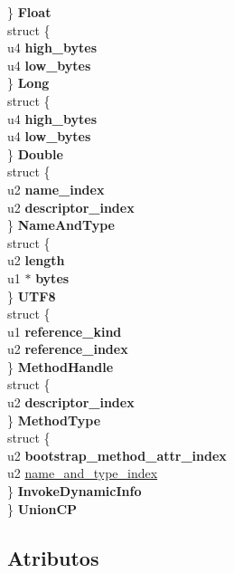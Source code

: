 \begin{DoxyCompactItemize}
\begin{tabbing}
\>\} {\bfseries Float}\\
\>struct \{\\
\>\>u4 {\bfseries high\_bytes}\\
\>\>u4 {\bfseries low\_bytes}\\
\>\} {\bfseries Long}\\
\>struct \{\\
\>\>u4 {\bfseries high\_bytes}\\
\>\>u4 {\bfseries low\_bytes}\\
\>\} {\bfseries Double}\\
\>struct \{\\
\>\>u2 {\bfseries name\_index}\\
\>\>u2 {\bfseries descriptor\_index}\\
\>\} {\bfseries NameAndType}\\
\>struct \{\\
\>\>u2 {\bfseries length}\\
\>\>u1 $\ast$ {\bfseries bytes}\\
\>\} {\bfseries UTF8}\\
\>struct \{\\
\>\>u1 {\bfseries reference\_kind}\\
\>\>u2 {\bfseries reference\_index}\\
\>\} {\bfseries MethodHandle}\\
\>struct \{\\
\>\>u2 {\bfseries descriptor\_index}\\
\>\} {\bfseries MethodType}\\
\>struct \{\\
\>\>u2 {\bfseries bootstrap\_method\_attr\_index}\\
\>\>u2 \hyperlink{structcp__info_a1b947f3ff3eee58acf5500debf45848c}{name\_and\_type\_index}\\
\>\} {\bfseries InvokeDynamicInfo}\\
\} {\bfseries UnionCP}\\

\end{tabbing}\end{DoxyCompactItemize}


\subsection{Atributos}
\mbox{\label{structcp__info_a1b947f3ff3eee58acf5500debf45848c}} 
